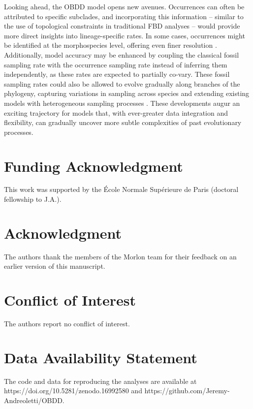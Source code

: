 \documentclass[oupdraft]{sysbio}
\begin{document}
Looking ahead, the OBDD model opens new avenues. Occurrences can often be attributed to specific subclades, and incorporating this information -- similar to the use of topological constraints in traditional FBD analyses \citep{baridosottani_putting_2023} -- would provide more direct insights into lineage-specific rates. In some cases, occurrences might be identified at the morphospecies level, offering even finer resolution \citep{silvestro_bayesian_2014, stadler_fossilized_2018}.  Additionally, model accuracy may be enhanced by coupling the classical fossil sampling rate with the occurrence sampling rate instead of inferring them independently, as these rates are expected to partially co-vary. These fossil sampling rates could also be allowed to evolve gradually along branches of the phylogeny, capturing variations in sampling across species and extending existing models with heterogeneous sampling processes \citep{barido-sottani_integrating_2025}.  These developments augur an exciting trajectory for models that, with ever-greater data integration and flexibility, can gradually uncover more subtle complexities of past evolutionary processes.

\section{Funding Acknowledgment}

This work was supported by the École Normale Supérieure de Paris (doctoral fellowship to J.A.).

\section{Acknowledgment}

The authors thank the members of the Morlon team for their feedback on an earlier version of this manuscript.

\section{Conflict of Interest}

The authors report no conflict of interest.

\section*{Data Availability Statement}

The code and data for reproducing the analyses are available at https://doi.org/10.5281/zenodo.16992580 and https://github.com/Jeremy-Andreoletti/OBDD.
\end{document}
